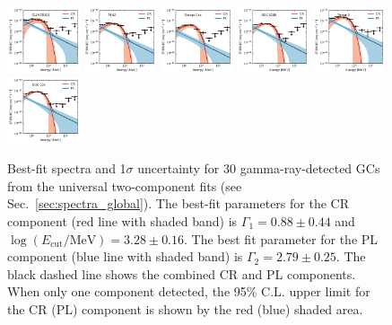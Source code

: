 \documentclass[doublespace,nopageskip]{VTthesis} %
\begin{document}
\begin{appendices}
\begin{figure}
\includegraphics[width=0.19\textwidth]{Figures/Globular/spectra/2comp_1.pdf}
\includegraphics[width=0.19\textwidth]{Figures/Globular/spectra/2comp_11.pdf}
\includegraphics[width=0.19\textwidth]{Figures/Globular/spectra/2comp_6.pdf}
\includegraphics[width=0.19\textwidth]{Figures/Globular/spectra/2comp_15.pdf}
\includegraphics[width=0.19\textwidth]{Figures/Globular/spectra/2comp_29.pdf}
\includegraphics[width=0.19\textwidth]{Figures/Globular/spectra/2comp_3.pdf}
\caption{Best-fit spectra and 1$\sigma$ uncertainty for 30 gamma-ray-detected GCs from the universal two-component fits (see Sec.~\ref{sec:spectra_global}). The best-fit parameters for the CR component (red line with shaded band) is $\Gamma_1 = 0.88 \pm 0.44$ and $\log(E_\mathrm{cut}/\mathrm{MeV})=3.28 \pm 0.16$. The best fit parameter for the {PL} component (blue line with shaded band) is $\Gamma_2 = 2.79 \pm 0.25$. 
The black dashed line shows the combined CR and {PL} components. When only one component detected, the 95\% C.L. upper limit for the CR ({PL}) component is shown by the red (blue) shaded area.}
\label{fig:2comp}
\end{figure}


\end{appendices}
\end{document}
